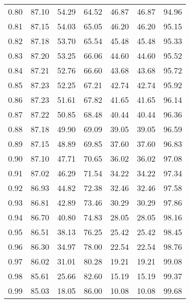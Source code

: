 \begin{tabular}{|c|c|c|c|c|c|c|}
      0.80 &     87.10 &     54.29 &      64.52 &   46.87 &      46.87 &         94.96 \\
      0.81 &     87.15 &     54.03 &      65.05 &   46.20 &      46.20 &         95.15 \\
      0.82 &     87.18 &     53.70 &      65.54 &   45.48 &      45.48 &         95.33 \\
      0.83 &     87.20 &     53.25 &      66.06 &   44.60 &      44.60 &         95.52 \\
      0.84 &     87.21 &     52.76 &      66.60 &   43.68 &      43.68 &         95.72 \\
      0.85 &     87.23 &     52.25 &      67.21 &   42.74 &      42.74 &         95.92 \\
      0.86 &     87.23 &     51.61 &      67.82 &   41.65 &      41.65 &         96.14 \\
      0.87 &     87.22 &     50.85 &      68.48 &   40.44 &      40.44 &         96.36 \\
      0.88 &     87.18 &     49.90 &      69.09 &   39.05 &      39.05 &         96.59 \\
      0.89 &     87.15 &     48.89 &      69.85 &   37.60 &      37.60 &         96.83 \\
      0.90 &     87.10 &     47.71 &      70.65 &   36.02 &      36.02 &         97.08 \\
      0.91 &     87.02 &     46.29 &      71.54 &   34.22 &      34.22 &         97.34 \\
      0.92 &     86.93 &     44.82 &      72.38 &   32.46 &      32.46 &         97.58 \\
      0.93 &     86.81 &     42.89 &      73.46 &   30.29 &      30.29 &         97.86 \\
      0.94 &     86.70 &     40.80 &      74.83 &   28.05 &      28.05 &         98.16 \\
      0.95 &     86.51 &     38.13 &      76.25 &   25.42 &      25.42 &         98.45 \\
      0.96 &     86.30 &     34.97 &      78.00 &   22.54 &      22.54 &         98.76 \\
      0.97 &     86.02 &     31.01 &      80.28 &   19.21 &      19.21 &         99.08 \\
      0.98 &     85.61 &     25.66 &      82.60 &   15.19 &      15.19 &         99.37 \\
      0.99 &     85.03 &     18.05 &      86.00 &   10.08 &      10.08 &         99.68 \\
\bottomrule
\end{tabular}
